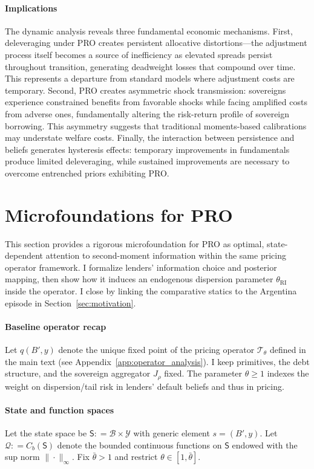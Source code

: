 \documentclass[12pt]{article}
\providecommand{\coloneqq}{\mathrel{\mathop:}=}
\theoremstyle{plain}
\begin{document}
\paragraph{Implications}

The dynamic analysis reveals three fundamental economic mechanisms. First,
deleveraging under PRO creates persistent allocative distortions—the adjustment
process itself becomes a source of inefficiency as elevated spreads persist
throughout transition, generating deadweight losses that compound over time.
This represents a departure from standard models where adjustment costs are
temporary. Second, PRO creates asymmetric shock transmission: sovereigns
experience constrained benefits from favorable shocks while facing amplified
costs from adverse ones, fundamentally altering the risk-return profile of
sovereign borrowing. This asymmetry suggests that traditional moments-based
calibrations may understate welfare costs. Finally, the interaction between
persistence and beliefs generates hysteresis effects: temporary improvements in
fundamentals produce limited deleveraging, while sustained improvements are
necessary to overcome entrenched priors exhibiting PRO.

\section{Microfoundations for PRO}\label{sec:micro}

This section provides a rigorous microfoundation for PRO as optimal,
state-dependent attention to second-moment information within the same pricing
operator framework. I formalize lenders' information choice and posterior
mapping, then show how it induces an endogenous dispersion parameter
$\theta_{\mathrm{RI}}$ inside the operator. I close by linking the comparative
statics to the Argentina episode in Section~\ref{sec:motivation}.

\paragraph{Baseline operator recap}
Let $q(B',y)$ denote the unique fixed point of the pricing operator $\mathcal
	T_\theta$ defined in the main text (see Appendix~\ref{app:operator_analysis}).
I keep primitives, the debt structure, and the sovereign aggregator $J_\rho$
fixed. The parameter $\theta\ge1$ indexes the weight on dispersion/tail risk in
lenders' default beliefs and thus in pricing.

\paragraph{State and function spaces}
Let the state space be $\mathsf S\coloneqq \mathcal B\times \mathcal Y$ with
generic element $s=(B',y)$. Let $\mathcal Q\coloneqq C_b(\mathsf S)$ denote the
bounded continuous functions on $\mathsf S$ endowed with the sup norm
$\|\cdot\|_\infty$. Fix $\bar\theta>1$ and restrict $\theta\in[1,\bar\theta]$.
\end{document}
